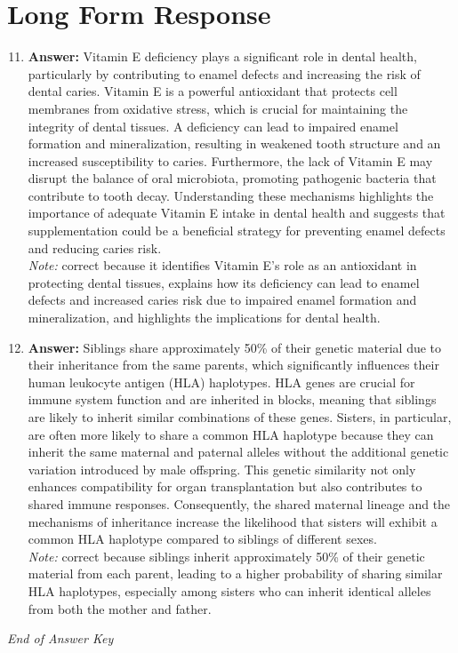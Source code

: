 \documentclass[12pt]{article}
\begin{document}
\section*{Long Form Response}
\begin{enumerate}[label=\arabic*.]
\setcounter{enumi}{10}
\item \textbf{Answer:} Vitamin E deficiency plays a significant role in dental health, particularly by contributing to enamel defects and increasing the risk of dental caries. Vitamin E is a powerful antioxidant that protects cell membranes from oxidative stress, which is crucial for maintaining the integrity of dental tissues. A deficiency can lead to impaired enamel formation and mineralization, resulting in weakened tooth structure and an increased susceptibility to caries. Furthermore, the lack of Vitamin E may disrupt the balance of oral microbiota, promoting pathogenic bacteria that contribute to tooth decay. Understanding these mechanisms highlights the importance of adequate Vitamin E intake in dental health and suggests that supplementation could be a beneficial strategy for preventing enamel defects and reducing caries risk.
\\ \textit{Note:} correct because it identifies Vitamin E's role as an antioxidant in protecting dental tissues, explains how its deficiency can lead to enamel defects and increased caries risk due to impaired enamel formation and mineralization, and highlights the implications for dental health.
\item \textbf{Answer:} Siblings share approximately 50\% of their genetic material due to their inheritance from the same parents, which significantly influences their human leukocyte antigen (HLA) haplotypes. HLA genes are crucial for immune system function and are inherited in blocks, meaning that siblings are likely to inherit similar combinations of these genes. Sisters, in particular, are often more likely to share a common HLA haplotype because they can inherit the same maternal and paternal alleles without the additional genetic variation introduced by male offspring. This genetic similarity not only enhances compatibility for organ transplantation but also contributes to shared immune responses. Consequently, the shared maternal lineage and the mechanisms of inheritance increase the likelihood that sisters will exhibit a common HLA haplotype compared to siblings of different sexes.
\\ \textit{Note:} correct because siblings inherit approximately 50\% of their genetic material from each parent, leading to a higher probability of sharing similar HLA haplotypes, especially among sisters who can inherit identical alleles from both the mother and father.
\end{enumerate}

\vfill
\noindent\textit{End of Answer Key}
\end{document}
